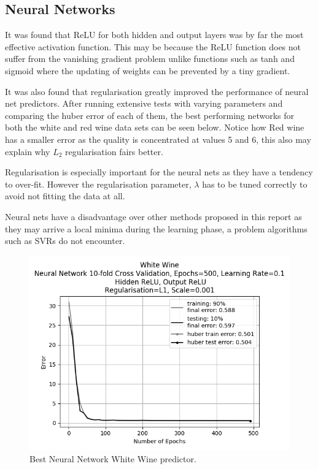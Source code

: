 \documentclass[10pt,twocolumn,letterpaper]{article}
\begin{document}
\subsection{Neural Networks}
It was found that ReLU for both hidden and output layers was by far the most effective activation function. This may be because the ReLU function does not suffer from the vanishing gradient problem unlike functions such as tanh and sigmoid where the updating of weights can be prevented by a tiny gradient. 

It was also found that regularisation greatly improved the performance of neural net predictors. After running extensive tests with varying parameters and comparing the huber error of each of them, the best performing networks for both the white and red wine data sets can be seen below. Notice how Red wine has a smaller error as the quality is concentrated at values 5 and 6, this also may explain why $L_2$ regularisation fairs better.

Regularisation is especially important for the neural nets as they have a tendency to over-fit. However the regularisation parameter, $\lambda$ has to be tuned correctly to avoid not fitting the data at all.

Neural nets have a disadvantage over other methods proposed in this report as they may arrive a local minima during the learning phase, a problem algorithms such as SVRs do not encounter.

\begin{figure}[h]
	\begin{center}
		\includegraphics[width=0.9\linewidth]{img/best_white_nn.png}
	\end{center}
	\caption{Best Neural Network White Wine predictor.}
	\label{fig:wwbest}
\end{figure}
\end{document}
